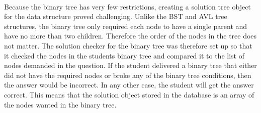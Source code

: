 \\[11pt]
Because the binary tree has very few restrictions, creating a solution tree object for the data structure proved challenging. Unlike the BST and AVL tree structures, the binary tree only required each node to have a single parent and have no more than two children. Therefore the order of the nodes in the tree does not matter. The solution checker for the binary tree was therefore set up so that it checked the nodes in the students binary tree and compared it to the list of nodes demanded in the question. If the student delivered a binary tree that either did not have the required nodes or broke any of the binary tree conditions, then the answer would be incorrect. In any other case, the student will get the answer correct. This means that the solution object stored in the database is an array of the nodes wanted in the binary tree.